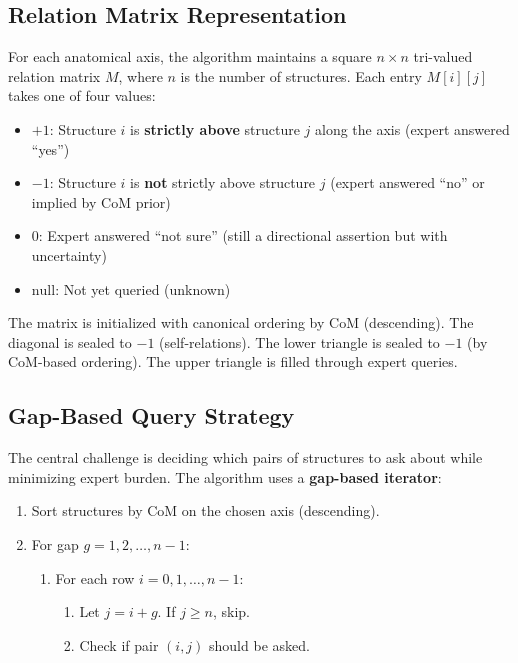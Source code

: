 \documentclass[12pt,a4paper]{article}
\begin{document}
\subsection{Relation Matrix Representation}

For each anatomical axis, the algorithm maintains a square $n \times n$ tri-valued relation matrix $M$, where $n$ is the number of structures. Each entry $M[i][j]$ takes one of four values:

\begin{itemize}
  \item $+1$: Structure $i$ is \textbf{strictly above} structure $j$ along the axis (expert answered ``yes'')
  \item $-1$: Structure $i$ is \textbf{not} strictly above structure $j$ (expert answered ``no'' or implied by CoM prior)
  \item $0$: Expert answered ``not sure'' (still a directional assertion but with uncertainty)
  \item $\text{null}$: Not yet queried (unknown)
\end{itemize}

The matrix is initialized with canonical ordering by CoM (descending). The diagonal is sealed to $-1$ (self-relations). The lower triangle is sealed to $-1$ (by CoM-based ordering). The upper triangle is filled through expert queries.

\subsection{Gap-Based Query Strategy}

The central challenge is deciding which pairs of structures to ask about while minimizing expert burden. The algorithm uses a \textbf{gap-based iterator}:

\begin{enumerate}
  \item Sort structures by CoM on the chosen axis (descending).
  \item For gap $g = 1, 2, \ldots, n-1$:
  \begin{enumerate}
    \item For each row $i = 0, 1, \ldots, n-1$:
    \begin{enumerate}
      \item Let $j = i + g$. If $j \geq n$, skip.
      \item Check if pair $(i, j)$ should be asked.
    \end{enumerate}
  \end{enumerate}
\end{enumerate}
\end{document}
